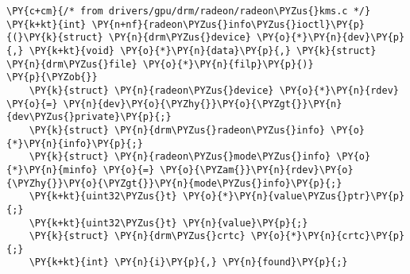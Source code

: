 \begin{Verbatim}[commandchars=\\\{\}]
\PY{c+cm}{/* from drivers/gpu/drm/radeon/radeon\PYZus{}kms.c */}
\PY{k+kt}{int} \PY{n+nf}{radeon\PYZus{}info\PYZus{}ioctl}\PY{p}{(}\PY{k}{struct} \PY{n}{drm\PYZus{}device} \PY{o}{*}\PY{n}{dev}\PY{p}{,} \PY{k+kt}{void} \PY{o}{*}\PY{n}{data}\PY{p}{,} \PY{k}{struct} \PY{n}{drm\PYZus{}file} \PY{o}{*}\PY{n}{filp}\PY{p}{)}
\PY{p}{\PYZob{}}
	\PY{k}{struct} \PY{n}{radeon\PYZus{}device} \PY{o}{*}\PY{n}{rdev} \PY{o}{=} \PY{n}{dev}\PY{o}{\PYZhy{}}\PY{o}{\PYZgt{}}\PY{n}{dev\PYZus{}private}\PY{p}{;}
	\PY{k}{struct} \PY{n}{drm\PYZus{}radeon\PYZus{}info} \PY{o}{*}\PY{n}{info}\PY{p}{;}
	\PY{k}{struct} \PY{n}{radeon\PYZus{}mode\PYZus{}info} \PY{o}{*}\PY{n}{minfo} \PY{o}{=} \PY{o}{\PYZam{}}\PY{n}{rdev}\PY{o}{\PYZhy{}}\PY{o}{\PYZgt{}}\PY{n}{mode\PYZus{}info}\PY{p}{;}
	\PY{k+kt}{uint32\PYZus{}t} \PY{o}{*}\PY{n}{value\PYZus{}ptr}\PY{p}{;}
	\PY{k+kt}{uint32\PYZus{}t} \PY{n}{value}\PY{p}{;}
	\PY{k}{struct} \PY{n}{drm\PYZus{}crtc} \PY{o}{*}\PY{n}{crtc}\PY{p}{;}
	\PY{k+kt}{int} \PY{n}{i}\PY{p}{,} \PY{n}{found}\PY{p}{;}


\end{Verbatim}
